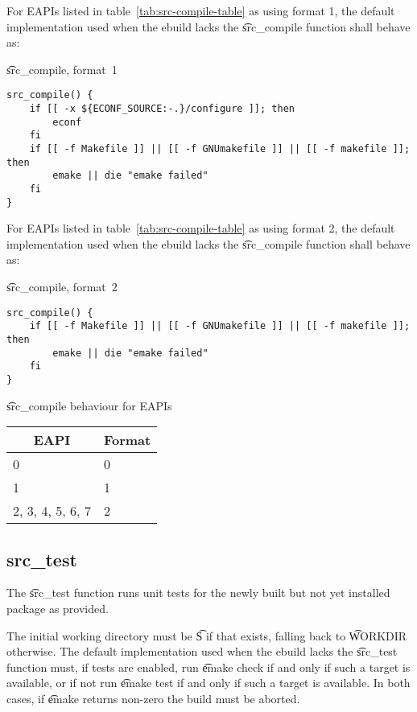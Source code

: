  For EAPIs listed in table~\ref{tab:src-compile-table} as using format
1, the default implementation used when the ebuild lacks the \t{src_compile} function shall behave
as:

\begin{listing}[H]
\caption{\t{src_compile}, format~1}
\begin{verbatim}
src_compile() {
    if [[ -x ${ECONF_SOURCE:-.}/configure ]]; then
        econf
    fi
    if [[ -f Makefile ]] || [[ -f GNUmakefile ]] || [[ -f makefile ]]; then
        emake || die "emake failed"
    fi
}
\end{verbatim}
\end{listing}

 For EAPIs listed in table~\ref{tab:src-compile-table} as using format
2, the default implementation used when the ebuild lacks the \t{src_compile} function shall behave
as:

\begin{listing}[H]
\caption{\t{src_compile}, format~2}
\begin{verbatim}
src_compile() {
    if [[ -f Makefile ]] || [[ -f GNUmakefile ]] || [[ -f makefile ]]; then
        emake || die "emake failed"
    fi
}
\end{verbatim}
\end{listing}

\begin{centertable}{\t{src_compile} behaviour for EAPIs}
    \label{tab:src-compile-table}
    \begin{tabular}{ll}
      \toprule
      \multicolumn{1}{c}{\textbf{EAPI}} &
      \multicolumn{1}{c}{\textbf{Format}} \\
      \midrule
      0                 & 0 \\
      1                 & 1 \\
      2, 3, 4, 5, 6, 7  & 2 \\
      \bottomrule
    \end{tabular}
\end{centertable}

\subsection{src_test}

The \t{src_test} function runs unit tests for the newly built but not yet installed package as
provided.

The initial working directory must be \t{S} if that exists, falling back to \t{WORKDIR} otherwise.
The default implementation used when the ebuild lacks the \t{src_test} function must, if tests are
enabled, run \t{emake check} if and only if such a target is available, or if not run
\t{emake test} if and only if such a target is available. In both cases, if \t{emake} returns
non-zero the build must be aborted.

